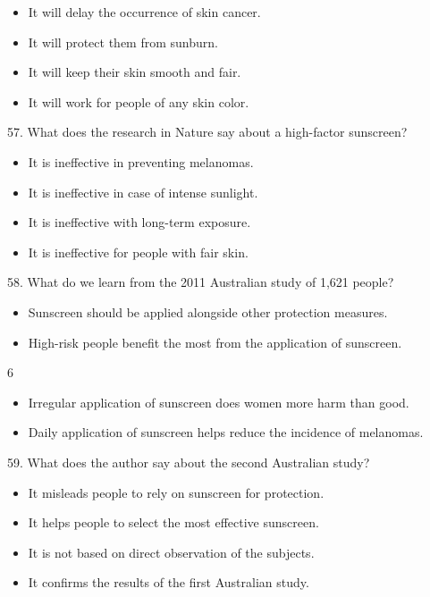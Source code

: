 \documentclass[UTF8,11pt]{ctexart}
\begin{document}
\begin{itemize}[leftmargin=2em,itemsep=.2em,topsep=.4em]\item[A.] It will delay the occurrence of skin cancer.
\item[B.] It will protect them from sunburn.
\item[C.] It will keep their skin smooth and fair.
\item[D.] It will work for people of any skin color.
\end{itemize}

57. What does the research in Nature say about a high-factor sunscreen?


\begin{itemize}[leftmargin=2em,itemsep=.2em,topsep=.4em]\item[A.] It is ineffective in preventing melanomas.
\item[B.] It is ineffective in case of intense sunlight.
\item[C.] It is ineffective with long-term exposure.
\item[D.] It is ineffective for people with fair skin.
\end{itemize}

58. What do we learn from the 2011 Australian study of 1,621 people?


\begin{itemize}[leftmargin=2em,itemsep=.2em,topsep=.4em]\item[A.] Sunscreen should be applied alongside other protection measures.
\item[B.] High-risk people benefit the most from the application of sunscreen.
\end{itemize}

6


\begin{itemize}[leftmargin=2em,itemsep=.2em,topsep=.4em]\item[C.] Irregular application of sunscreen does women more harm than good.
\item[D.] Daily application of sunscreen helps reduce the incidence of melanomas.
\end{itemize}

59. What does the author say about the second Australian study?


\begin{itemize}[leftmargin=2em,itemsep=.2em,topsep=.4em]\item[A.] It misleads people to rely on sunscreen for protection.
\item[B.] It helps people to select the most effective sunscreen.
\item[C.] It is not based on direct observation of the subjects.
\item[D.] It confirms the results of the first Australian study.
\end{itemize}
\end{document}

